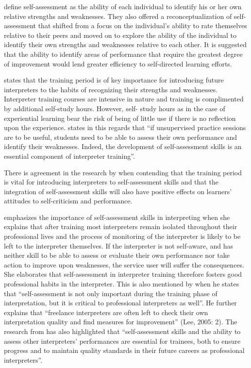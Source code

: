 \documentclass[output=paper]{langsci/langscibook}
\begin{document}
\citet[74]{RegehrEtAl1996} define self-assessment as the ability of each individual to identify his or her own relative strengths and weaknesses. They also offered a reconceptualization of self-assessment that shifted from a focus on the individual’s ability to rate themselves relative to their peers and moved on to explore the ability of the individual to identify their own strengths and weaknesses relative to each other. It is suggested that the ability to identify areas of performance that require the greatest degree of improvement would lend greater efficiency to self-directed learning efforts.

\citet{Riccardi2002} states that the training period is of key importance for introducing future interpreters to the habits of recognizing their strengths and weaknesses. Interpreter training courses are intensive in nature and training is complimented by additional self-study hours. However, self- study hours as in the case of experiential learning bear the risk of being of little use if there is no reflection upon the experience. \citet[4]{Sandrelli2007} states in this regards that “if unsupervised practice sessions are to be useful, students need to be able to assess their own performance and identify their weaknesses. Indeed, the development of self-assessment skills is an essential component of interpreter training”. 

There is agreement in the research by \citet[197]{Pinazo2008} when contending that the training period is vital for introducing interpreters to self-assessment skills and that the integration of self-assessment skills will also have positive effects on learners’ attitudes to self-criticism and performance. 

\citet[254]{Fowler2007} emphasizes the importance of self-assessment skills in interpreting when she explains that after training most interpreters remain isolated throughout their professional lives and the process of monitoring of the interpreter is likely to be left to the interpreter themselves. If the interpreter is not self-aware, and has neither skill to be able to assess or evaluate their own performance nor take action to improve upon weaknesses, the service user will suffer the consequences. She elaborates that self-assessment in interpreter training therefore fosters good professional habits in the interpreter. This is also mentioned by \citet[3]{Lee2005} when he states that “self-assessment is not only important during the training phase of interpretation, but it is critical to professional interpreters as well”. He further explains that “freelance interpreters are often left to check their own interpretation quality and find measures for improvement” (Lee, 2005: 2). The research from \citet[15]{Sandrelli2007} has also highlighted that “self-assessment skills and the ability to assess other interpreters’ performances are essential for trainees, both to ensure progress and to maintain quality standards in their future careers as professional interpreters”.
\end{document}
